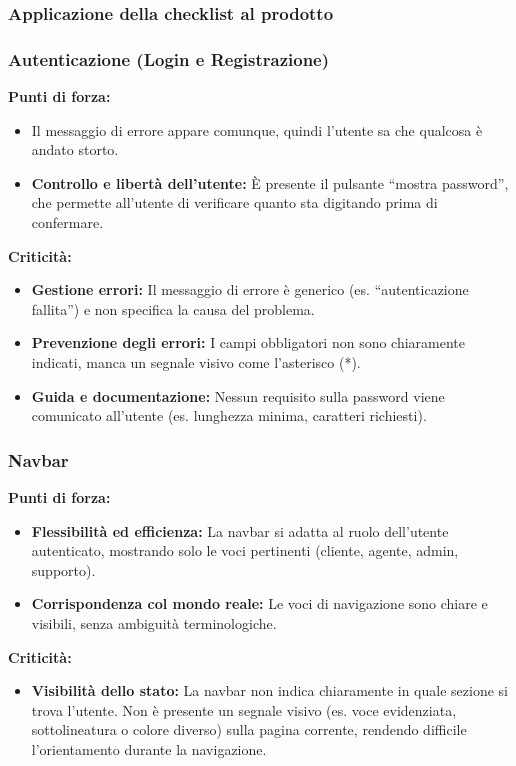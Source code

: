 \documentclass{article}
\begin{document}
\subsubsection{Applicazione della checklist al prodotto}

\subsubsection*{Autenticazione (Login e Registrazione)}

\textbf{Punti di forza:}
\begin{itemize}
    \item Il messaggio di errore appare comunque, quindi l'utente sa che qualcosa è andato storto.
    \item \textbf{Controllo e libertà dell'utente:} È presente il pulsante ``mostra password'', che permette all'utente di verificare quanto sta digitando prima di confermare.
\end{itemize}

\textbf{Criticità:}
\begin{itemize}
    \item \textbf{Gestione errori:} Il messaggio di errore è generico (es. ``autenticazione fallita'') e non specifica la causa del problema.
    \item \textbf{Prevenzione degli errori:} I campi obbligatori non sono chiaramente indicati, manca un segnale visivo come l'asterisco (*).
    \item \textbf{Guida e documentazione:} Nessun requisito sulla password viene comunicato all'utente (es. lunghezza minima, caratteri richiesti).
\end{itemize}

\subsubsection*{Navbar}

\textbf{Punti di forza:}
\begin{itemize}
    \item \textbf{Flessibilità ed efficienza:} La navbar si adatta al ruolo dell'utente autenticato, mostrando solo le voci pertinenti (cliente, agente, admin, supporto).
    \item \textbf{Corrispondenza col mondo reale:} Le voci di navigazione sono chiare e visibili, senza ambiguità terminologiche.
\end{itemize}

\textbf{Criticità:}
\begin{itemize}
    \item \textbf{Visibilità dello stato:} La navbar non indica chiaramente in quale sezione si trova l'utente. Non è presente un segnale visivo (es. voce evidenziata, sottolineatura o colore diverso) sulla pagina corrente, rendendo difficile l'orientamento durante la navigazione.
\end{itemize}
\end{document}
